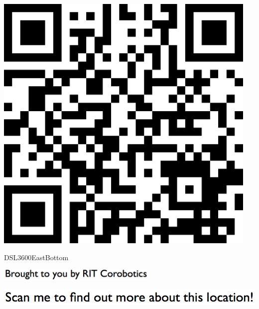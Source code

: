 \documentclass[letterpaper]{article}
\begin{document}
 \begingroup 
 \centerline{\includegraphics[scale=1,width=5in,height=5in]{DSL3600EastBottom.png}} 
 \endgroup 
 \vspace*{\fill} 

 \hfill{\small DSL3600EastBottom} 

  \vspace{0.7in} 
 
 \centerline{\includegraphics[scale=1,width=3in]{text-bottom.png}} 
 
 \pagebreak 
{} 
 \vspace*{\fill} 
 
  \centerline{\includegraphics[scale=1,width=6in]{text-top.png}} 
 
 \vspace{0.5in} 
 
\end{document}
